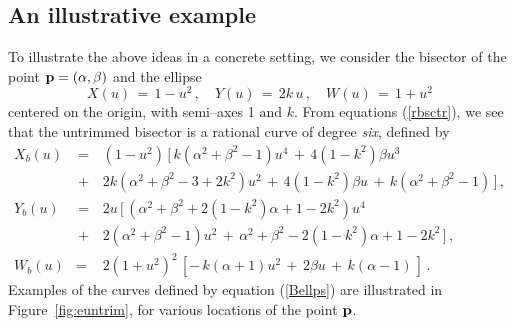 
\subsection{An illustrative example}

To illustrate the above ideas in a concrete setting, we consider
the bisector of the point ${\bf p}=(\alpha,\beta)$ and the ellipse
\begin{equation} \label{pellipse}
X(u) \,=\, 1-u^2 \,, \quad
Y(u) \,=\, 2k\,u \,, \quad
W(u) \,=\, 1+u^2
\end{equation}
centered on the origin, with semi--axes 1 and $k$. From equations
(\ref{rbsctr}), we see that the untrimmed bisector is a rational
curve of degree {\it six}, defined by
\begin{eqnarray} \label{Bellps}
X_b(u) &\,=\,& (1-u^2)\, [\, k(\alpha^2+\beta^2-1)u^4
               \,+\, 4(1-k^2)\beta u^3 \nonumber \\
       &\,+\,& 2k(\alpha^2+\beta^2-3+2k^2)u^2 \,+\, 4(1-k^2)\beta u
               \,+\, k(\alpha^2+\beta^2-1) \,] \,, \nonumber \\
Y_b(u) &\,=\,& 2u\, [\, (\alpha^2+\beta^2+2(1-k^2)\alpha+1-2k^2)u^4
               \nonumber \\
       &\,+\,& 2(\alpha^2+\beta^2-1)u^2 \,+\, \alpha^2+\beta^2
               -2(1-k^2)\alpha+1-2k^2 \,] \,, \nonumber \\
W_b(u) &=& 2(1+u^2)^2\, [ -\,k(\alpha+1)u^2
                \,+\, 2\beta u \,+\, k(\alpha-1) \,] \,.
\end{eqnarray}
Examples of the curves defined by equation (\ref{Bellps}) are
illustrated in Figure~\ref{fig:euntrim}, for various locations of
the point ${\bf p}$.

